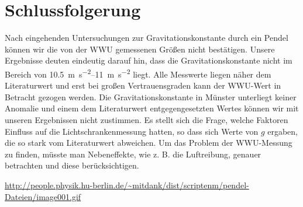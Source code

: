 \documentclass[11pt,a4paper,titlepage, ngerman]{article}
\begin{document}
	\section{Schlussfolgerung}
		Nach eingehenden Untersuchungen zur Gravitationskonstante durch ein Pendel können wir die von der WWU gemessenen Größen nicht bestätigen.
		Unsere Ergebnisse deuten eindeutig darauf hin, dass die Gravitationskonstante nicht im Bereich von \SIrange{10,5}{11}{\meter\per\second\squared} liegt.
		Alle Messwerte liegen näher dem Literaturwert und erst bei großen Vertrauensgraden kann der WWU-Wert in Betracht gezogen werden.
		Die Gravitationskonstante in Münster unterliegt keiner Anomalie und einem dem Literaturwert entgegengesetzten Wertes können wir mit unseren Ergebnissen nicht zustimmen.
		Es stellt sich die Frage, welche Faktoren Einfluss auf die Lichtschrankenmessung hatten, so dass sich Werte von $g$ ergaben, die so stark vom Literaturwert abweichen.
		Um das Problem der WWU-Messung zu finden, müsste man Nebeneffekte, wie z. B. die Luftreibung, genauer betrachten und diese berücksichtigen.	
		
		\newpage
		
		\begin{thebibliography}{9}		
			\item[Abbildung 2:] \url{http://people.physik.hu-berlin.de/~mitdank/dist/scriptenm/pendel-Dateien/image001.gif}			
		\end{thebibliography}	
			
\end{document}
